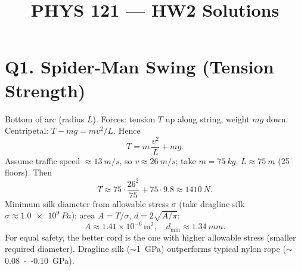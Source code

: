 \documentclass[11pt]{article}
\title{PHYS 121 --- HW2 Solutions}
\newcommand{\ans}[1]{\boxed{\displaystyle #1}}
\begin{document}
\maketitle
{}

\def\g{\,\mathrm{g}}

\section*{Q1. Spider-Man Swing (Tension \/ Strength)}
Bottom of arc (radius $L$). Forces: tension $T$ up along string, weight $mg$ down. Centripetal: $T - mg = m v^2/L$. Hence
\[ T = m\,\frac{v^2}{L} + mg. \]
Assume traffic speed $\approx\SI{13}{m/s}$, so $v\approx\SI{26}{m/s}$; take $m=\SI{75}{kg}$, $L\approx\SI{75}{m}$ (25 floors). Then
\[ T \approx 75\cdot\frac{26^2}{75}+75\cdot9.8 \approx \SI{1410}{N}. \]
Minimum silk diameter from allowable stress $\sigma$ (take dragline silk $\sigma\approx\SI{1.0e9}{Pa}$): area $A=T/\sigma$, $d=2\sqrt{A/\pi}$:
\[ A\approx1.41\times10^{-6}\,\mathrm{m^2},\quad \ans{d_{\min}\approx\SI{1.34}{mm}}. \]
For equal safety, the better cord is the one with higher allowable stress (smaller required diameter). Dragline silk (\(\sim\)\SI{1}{GPa}) outperforms typical nylon rope (\(\sim\)\SI{0.08}{--}\SI{0.10}{GPa}).

\begin{center}
\end{center}
\end{document}
